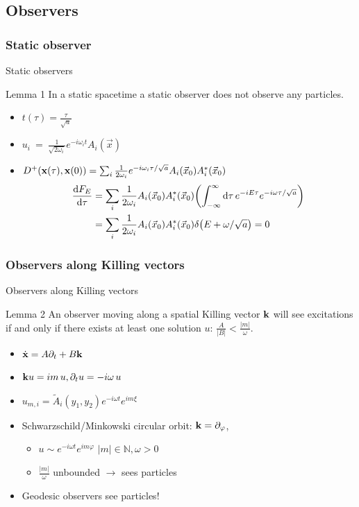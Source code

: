 \documentclass{beamer}
\renewcommand{\va}[1]{\vec{#1}}
\begin{document}
\subsection{Observers}
\subsubsection{Static observer}
\begin{frame}{Static observers}
\begin{block}{Lemma 1}
In a static spacetime a static observer does not observe any particles.
\end{block}
\begin{itemize}
	\item \(t(\tau) = \frac{\tau}{\sqrt{a}}\)
	\item \(u_i~=~\frac{1}{\sqrt{2\omega_i}}e^{-i\omega_i t} A_i(\va{x})\)
	\item \(D^+(\vb{x}(\tau), \vb{x}(0)) = \sum_i \frac{1}{2\omega_i} e^{-i\omega_i\tau/\sqrt{a}} A_i(\va{x}_0)A_i^*(\va{x}_0)\)
	\begin{align*}
	\dv{F_E}{\tau} &= \sum_i \frac{1}{2\omega_i} A_i(\va{x}_0)A_i^*(\va{x}_0) \qty(\int_{-\infty}^\infty \dd{\tau} e^{-i E \tau} e^{-i\omega  \tau/\sqrt{a}})\\
	 	&= \sum_i \frac{1}{2\omega_i} A_i(\va{x}_0)A_i^*(\va{x}_0) \delta\qty(E + \omega/\sqrt{a}) = 0
	\end{align*}
\end{itemize}
\end{frame}

\subsubsection{Observers along Killing vectors}
\begin{frame}{Observers along Killing vectors}
\begin{block}{Lemma 2}
An observer moving along a spatial Killing vector \(\vb{k}\) will see excitations if and only if there exists at least one solution \(u\): \(\frac{A}{|B|} < \frac{|m|}{\omega}\).
\begin{itemize}
	\item \(\dot{\vb{x}} = A\partial_t + B\vb{k}\)
	\item \(\vb{k} u = i m\,u, \partial_t u = - i \omega\,u\)
\end{itemize}
\end{block} 
\begin{itemize}
	\item \(u_{m, i} = \tilde{A}_i(y_1, y_2) e^{-i\omega t} e^{i m \xi}\)
	\item Schwarzschild/Minkowski circular orbit: \(\vb{k} = \partial_\varphi\), 
	\begin{itemize}
		\item \(u \sim e^{-i\omega t}e^{i m \varphi}\)\hspace{5cm} \(|m| \in \mathbb{N}, \omega > 0\)
		\item \(\frac{|m|}{\omega}\) unbounded \(\to\) sees particles
	\end{itemize}
	\item Geodesic observers see particles!
\end{itemize}
\end{frame}
\end{document}
